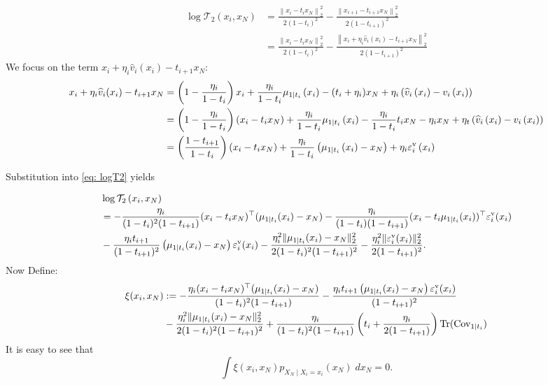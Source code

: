 \documentclass{article}
\theoremstyle{plain}
\theoremstyle{definition}
\theoremstyle{remark}
\def\Norm#1{\Vert#1\Vert}
\def\Cov{\text{Cov}}
\DeclareMathOperator{\Tr}{Tr}
\begin{document}
\begin{equation}
\label{eq: logT2}
\begin{aligned}
\log \mathcal{T}_{2}\left(x_{i}, x_{N}\right) & =\frac{\left\|x_{i}-t_i x_N\right\|_{2}^{2}}{2\left(1-t_i\right)^2}-\frac{\left\|x_{i+1}-t_{i+1}x_N\right\|_{2}^{2}}{2\left(1-t_{i+1}\right)^2}\\
& =\frac{\left\|x_{i}-t_i x_N\right\|_{2}^{2}}{2\left(1-t_i\right)^2}-\frac{\left\|x_{i} + \eta_i \widehat v_i(x_i)-t_{i+1}x_N\right\|_{2}^{2}}{2\left(1-t_{i+1}\right)^2}
\end{aligned}
\end{equation}
We focus on the term $x_{i} + \eta_i \widehat v_i(x_i)-t_{i+1}x_N$:
$$
\begin{aligned}
x_{i} + \eta_i \widehat v_i(x_i)-t_{i+1}x_N & =\left(1-\frac{\eta_{i}}{1-t_i}\right) x_{i}+\frac{ \eta_{i}}{1-t_i} \mu_{1 \mid t_i}\left(x_{i}\right) - (t_{i} + \eta_i) x_N + \eta_{i}\left(\widehat v_{i}\left(x_{i}\right)-v_{i}\left(x_{i}\right)\right)
\\
& =\left(1-\frac{\eta_{i}}{1-t_i}\right)\left(x_{i}- t_{i} x_N\right)+\frac{ \eta_{i}}{1-t_i} \mu_{1 \mid t_i}\left(x_{i}\right)-\frac{\eta_{i}}{1-t_i} t_{i} x_N - \eta_i x_N + \eta_{t}\left(\widehat v_{i}\left(x_{i}\right)-v_{i}\left(x_{i}\right)\right) 
\\
& =\left(\frac{1 - t_{i+1}}{1-t_i}\right)\left(x_{i}-t_i x_N\right)+\frac{\eta_i}{1-t_i}\left(\mu_{1 \mid t_i}\left(x_{i}\right)-x_{N}\right)
+
\eta_{i} \varepsilon_{i}^{\rm v}\left(x_{i}\right) 
\end{aligned}
$$

Substitution into \eqref{eq: logT2} yields

\begin{equation}
\label{eq: logT2_expanded}
\begin{aligned}
& \log \mathcal{T}_{2}\left(x_{i}, x_{N}\right)\\
& = -\frac{\eta_i}{(1-t_i)^2 (1-t_{i+1})}(x_i - t_i x_N)^\top(\mu_{1\mid t_i}(x_i) - x_N) - \frac{\eta_i}{(1-t_i)(1-t_{i+1})}(x_i - t_i \mu_{1 \mid t_i}(x_i))^\top \varepsilon_i^{\rm v}(x_i)
\\
& - \frac{\eta_i t_{i+1}}{(1-t_{i+1})^2} \left(\mu_{1\mid t_i}(x_i) - x_N\right) \varepsilon_i^{\rm v}(x_i)
 - \frac{\eta_i^2 \Norm{\mu_{1\mid t_i}(x_i) - x_N}_2^2 }{2(1-t_i)^2 (1-t_{i+1})^2} - \frac{\eta_i^2 \Norm{\varepsilon_i^{\rm v}(x_i)}_2^2}{2(1-t_{i+1})^2}.
\end{aligned}
\end{equation}
Now Define:
\begin{align*}
\xi(x_i, x_N)& := -\frac{\eta_i(x_i - t_i x_N)^\top(\mu_{1\mid t_i}(x_i) - x_N)}{(1-t_i)^2 (1-t_{i+1})} - \frac{\eta_i t_{i+1}\left(\mu_{1\mid t_i}(x_i) - x_N\right) \varepsilon_i^{\rm v}(x_i)}{ (1-t_{i+1})^2} \\
 & - \frac{\eta_i^2 \Norm{\mu_{1\mid t_i}(x_i) - x_N}_2^2 }{2(1-t_i)^2 (1-t_{i+1})^2} + \frac{\eta_i}{(1-t_i)^2 (1-t_{i+1})} \left(t_i + \frac{\eta_i}{2(1-t_{i+1})}\right) \Tr(\Cov_{1\mid t_i})
\end{align*}
It is easy to see that 
\[
\int \xi(x_i, x_N) p_{X_N\mid X_i = x_i}(x_N) \; dx_N = 0.
\]
\end{document}
